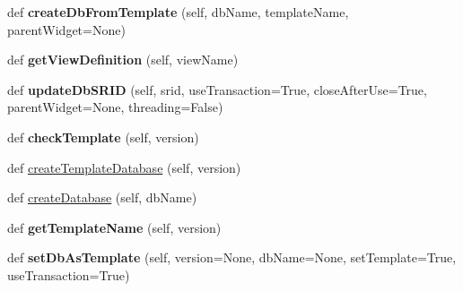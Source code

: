 \begin{DoxyCompactItemize}
\mbox{\label{class_dsg_tools_1_1_factories_1_1_db_factory_1_1postgis_db_1_1_postgis_db_a57c840968689cc321fc17e698748201d}} 
def {\bfseries create\+Db\+From\+Template} (self, db\+Name, template\+Name, parent\+Widget=None)
\item 
\mbox{\label{class_dsg_tools_1_1_factories_1_1_db_factory_1_1postgis_db_1_1_postgis_db_aef17be73033aacc4371d5e5a4b4fa283}} 
def {\bfseries get\+View\+Definition} (self, view\+Name)
\item 
\mbox{\label{class_dsg_tools_1_1_factories_1_1_db_factory_1_1postgis_db_1_1_postgis_db_a5ed14c1d99d4a4e5881b0c202840e4d7}} 
def {\bfseries update\+Db\+S\+R\+ID} (self, srid, use\+Transaction=True, close\+After\+Use=True, parent\+Widget=None, threading=False)
\item 
\mbox{\label{class_dsg_tools_1_1_factories_1_1_db_factory_1_1postgis_db_1_1_postgis_db_a7c237b580115c20ab9d518208a0d99b0}} 
def {\bfseries check\+Template} (self, version)
\item 
def \mbox{\hyperlink{class_dsg_tools_1_1_factories_1_1_db_factory_1_1postgis_db_1_1_postgis_db_ac9366aea071d6c0baa3c02094a2b69a6}{create\+Template\+Database}} (self, version)
\item 
def \mbox{\hyperlink{class_dsg_tools_1_1_factories_1_1_db_factory_1_1postgis_db_1_1_postgis_db_aecdf533d27f0820aa5caa706b1f89cf0}{create\+Database}} (self, db\+Name)
\item 
\mbox{\label{class_dsg_tools_1_1_factories_1_1_db_factory_1_1postgis_db_1_1_postgis_db_ac8bc869fdbf75527dd014b9b05397d63}} 
def {\bfseries get\+Template\+Name} (self, version)
\item 
\mbox{\label{class_dsg_tools_1_1_factories_1_1_db_factory_1_1postgis_db_1_1_postgis_db_a1bef862d02fb6623db429c03836fc068}} 
def {\bfseries set\+Db\+As\+Template} (self, version=None, db\+Name=None, set\+Template=True, use\+Transaction=True)

\end{DoxyCompactItemize}
